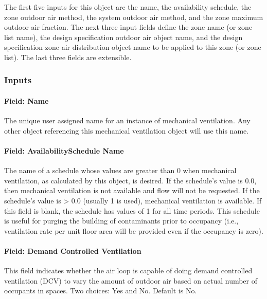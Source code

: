 The first five inputs for this object are the name, the availability schedule, the zone outdoor air method, the system outdoor air method, and the zone maximum outdoor air fraction. The next three input fields define the zone name (or zone list name), the design specification outdoor air object name, and the design specification zone air distribution object name to be applied to this zone (or zone list). The last three fields are extensible.

\subsubsection{Inputs}\label{inputs-2-007}

\paragraph{Field: Name}\label{field-name-2-006}

The unique user assigned name for an instance of mechanical ventilation. Any other object referencing this mechanical ventilation object will use this name.

\paragraph{Field: AvailabilitySchedule Name}\label{field-availabilityschedule-name}

The name of a schedule whose values are greater than 0 when mechanical ventilation, as calculated by this object, is desired. If the schedule's value is 0.0, then mechanical ventilation is not available and flow will not be requested. If the schedule's value is \textgreater{} 0.0 (usually 1 is used), mechanical ventilation is available. If this field is blank, the schedule has values of 1 for all time periods. This schedule is useful for purging the building of contaminants prior to occupancy (i.e., ventilation rate per unit floor area will be provided even if the occupancy is zero).

\paragraph{Field: Demand Controlled Ventilation}\label{field-demand-controlled-ventilation}

This field indicates whether the air loop is capable of doing demand controlled ventilation (DCV) to vary the amount of outdoor air based on actual number of occupants in spaces. Two choices: Yes and No. Default is No.

